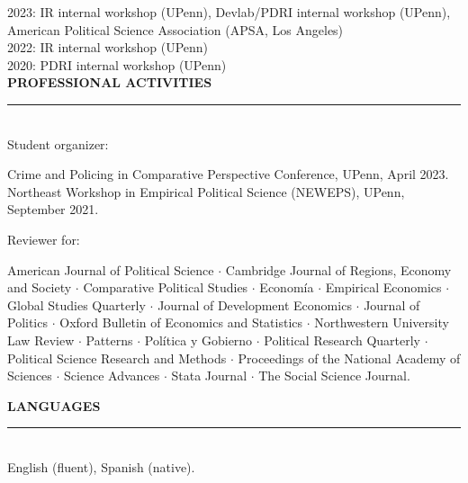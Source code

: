 \documentclass[10pt, english]{article}
\begin{document}
2023: IR internal workshop (UPenn), Devlab/PDRI internal workshop (UPenn), American Political Science Association (APSA, Los Angeles) \\

2022: IR internal workshop (UPenn)\\

2020: PDRI internal workshop (UPenn)\\

\vspace{0.2cm}
\textbf{PROFESSIONAL ACTIVITIES}

\noindent\rule{\textwidth}{1pt}\\

Student organizer:
\vspace{-0.15cm}
\begin{flushright}
\begin{minipage}{0.95\textwidth}
Crime and Policing in Comparative Perspective Conference, UPenn, April 2023.\\
Northeast Workshop in Empirical Political Science (NEWEPS), UPenn, September 2021.
\end{minipage}
\end{flushright}

Reviewer for:
\vspace{-0.15cm}
\begin{flushright}
\begin{minipage}{0.95\textwidth}
American Journal of Political Science $\cdot$ Cambridge Journal of Regions, Economy and Society $\cdot$ Comparative Political Studies $\cdot$ Econom\'ia $\cdot$ Empirical Economics $\cdot$ Global Studies Quarterly $\cdot$ Journal of Development Economics $\cdot$ Journal of Politics $\cdot$ Oxford Bulletin of Economics and Statistics $\cdot$ Northwestern University Law Review $\cdot$ Patterns $\cdot$ Pol\'itica y Gobierno $\cdot$ Political Research Quarterly $\cdot$ Political Science Research and Methods $\cdot$ Proceedings of the National Academy of Sciences $\cdot$ Science Advances $\cdot$ Stata Journal $\cdot$ The Social Science Journal.\\
\end{minipage}
\end{flushright}

\textbf{LANGUAGES}

\noindent\rule{\textwidth}{1pt}\\

English (fluent), Spanish (native).\\
\end{document}
